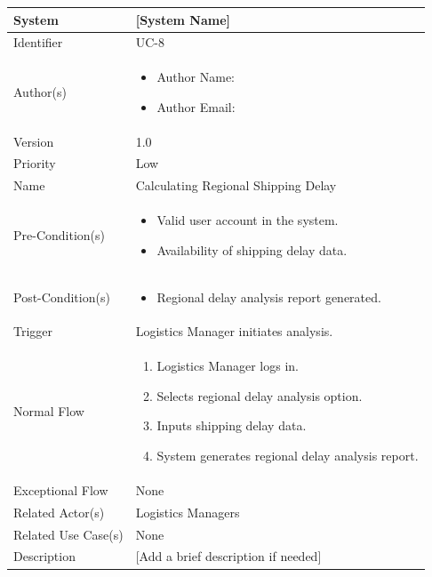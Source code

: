 \begin{center}
	\begin{tabularx}{\textwidth}{|l|X|}
		\hline
		System & [System Name] \\
		\hline
		Identifier & UC-8 \\
		\hline
		Author(s) & \begin{itemize}[left=0pt]
			\item Author Name:
			\item Author Email:
		\end{itemize} \\
		\hline
		Version & 1.0 \\
		\hline
		Priority & Low \\
		\hline
		Name & Calculating Regional Shipping Delay \\
		\hline
		Pre-Condition(s) &  \begin{itemize}[left=0pt]
			\item Valid user account in the system.
			\item Availability of shipping delay data.
		\end{itemize} \\
		\hline
		Post-Condition(s) & \begin{itemize}[left=0pt]
			\item Regional delay analysis report generated.
		\end{itemize} \\
		\hline
		Trigger & Logistics Manager initiates analysis. \\
		\hline
		Normal Flow & \begin{enumerate}[left=0pt]
			\item Logistics Manager logs in.
			\item Selects regional delay analysis option.
			\item Inputs shipping delay data.
			\item System generates regional delay analysis report.
		\end{enumerate} \\
		\hline
		Exceptional Flow & None \\
		\hline
		Related Actor(s) & Logistics Managers \\
		\hline
		Related Use Case(s) & None \\
		\hline
		Description & [Add a brief description if needed] \\
		\hline
	\end{tabularx}
\end{center}

